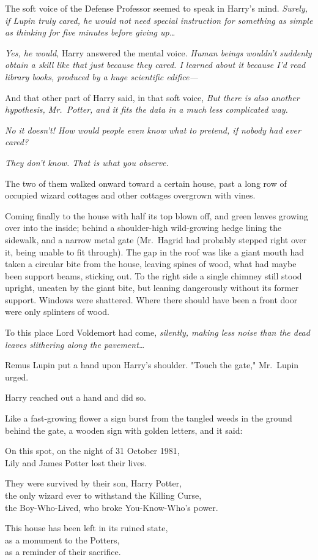 The soft voice of the Defense Professor seemed to speak in Harry's mind. 
\emph{Surely, if Lupin truly cared, he would not need special instruction for 
something as simple as thinking for five minutes before giving up{\ldots}}

\emph{Yes, he would,} Harry answered the mental voice. \emph{Human beings 
wouldn't suddenly obtain a skill like that just because they cared. I learned 
about it because I'd read library books, produced by a huge scientific 
edifice---}

And that other part of Harry said, in that soft voice, \emph{But there is also 
another hypothesis, Mr.~Potter, and it fits the data in a much less complicated 
way.}

\emph{No it doesn't! How would people even know what to pretend, if nobody had 
ever cared?}

\emph{They don't know. That is what you observe.}

The two of them walked onward toward a certain house, past a long row of 
occupied wizard cottages and other cottages overgrown with vines.

Coming finally to the house with half its top blown off, and green leaves 
growing over into the inside; behind a shoulder-high wild-growing hedge lining 
the sidewalk, and a narrow metal gate (Mr.~Hagrid had probably stepped right 
over it, being unable to fit through). The gap in the roof was like a giant 
mouth had taken a circular bite from the house, leaving spines of wood, what 
had maybe been support beams, sticking out. To the right side a single chimney 
still stood upright, uneaten by the giant bite, but leaning dangerously without 
its former support. Windows were shattered. Where there should have been a 
front door were only splinters of wood.

To this place Lord Voldemort had come, \emph{silently, making less noise than 
the dead leaves slithering along the pavement{\ldots}}

Remus Lupin put a hand upon Harry's shoulder. "Touch the gate," Mr.~Lupin urged.

Harry reached out a hand and did so.

Like a fast-growing flower a sign burst from the tangled weeds in the ground 
behind the gate, a wooden sign with golden letters, and it said:

\begin{center}
On this spot, on the night of 31 October 1981,\\
Lily and James Potter lost their lives.

They were survived by their son, Harry Potter,\\
the only wizard ever to withstand the Killing Curse,\\
the Boy-Who-Lived, who broke You-Know-Who's power.

This house has been left in its ruined state,\\
as a monument to the Potters,\\
as a reminder of their sacrifice.
\end{center}

